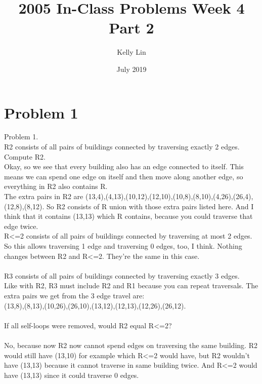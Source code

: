 \documentclass{article}
\title{2005 In-Class Problems Week 4 Part 2}
\author{ Kelly Lin }
\date{July 2019}
\begin{document}
\maketitle

\section{Problem 1}
Problem 1. 
\\
R2 consists of all pairs of buildings connected by traversing exactly 2 edges. Compute R2. 
\\
Okay, so we see that every building also has an edge connected to itself. This means we can spend one edge on itself and then move along another edge, so everything in R2 also contains R. 
\\
The extra pairs in R2 are (13,4),(4,13),(10,12),(12,10),(10,8),(8,10),(4,26),(26,4),(12,8),(8,12). So R2 consists of R union with those extra pairs listed here. And I think that it contains (13,13) which R contains, because you could traverse that edge twice. \\
R<=2 consists of all pairs of buildings connected by traversing at most 2 edges. 
\\
So this allows traversing 1 edge and traversing 0 edges, too, I think. Nothing changes between R2 and R<=2. They're the same in this case.
\\\\
R3 consists of all pairs of buildings  connected by traversing exactly 3 edges. 
\\
Like with R2, R3 must include R2 and R1 because you can repeat traversals. The extra pairs we get from the 3 edge travel are:
\\
(13,8),(8,13),(10,26),(26,10),(13,12),(12,13),(12,26),(26,12).
\\\\
If all self-loops were removed, would R2 equal R<=2?
\\\\
No, because now R2 now cannot spend edges on traversing the same building. R2 would still have (13,10) for example which R<=2 would have, but R2 wouldn't have (13,13) because it cannot traverse in same building twice. And R<=2 would have (13,13) since it could traverse 0 edges.
\end{document}
